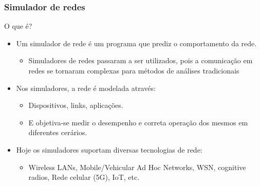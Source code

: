 \documentclass{beamer}
\begin{document}

\begin{frame}\frametitle{Simulador de redes}

\begin{block}{O que é?}
\begin{itemize}
	\item Um simulador de rede é um programa que prediz o comportamento da rede.
	\begin{itemize}
		\item Simuladores de redes passaram a ser utilizados, pois a comunicação em redes se tornaram complexas para métodos de análises tradicionais
	\end{itemize}
	\item Nos simuladores, a rede é modelada através:
	\begin{itemize}
		\item Dispositivos, links, aplicações.
		\item E objetiva-se medir o desempenho e correta operação dos mesmos em diferentes cerários.
	\end{itemize}
	\item Hoje os simuladores suportam diversas tecnologias de rede:
	\begin{itemize}
		\item Wireless LANs, Mobile/Vehicular Ad Hoc Networks, WSN, cognitive radios, Rede celular (5G), IoT, etc.
	\end{itemize}
\end{itemize}
\end{block}

\end{frame}

\end{document}
